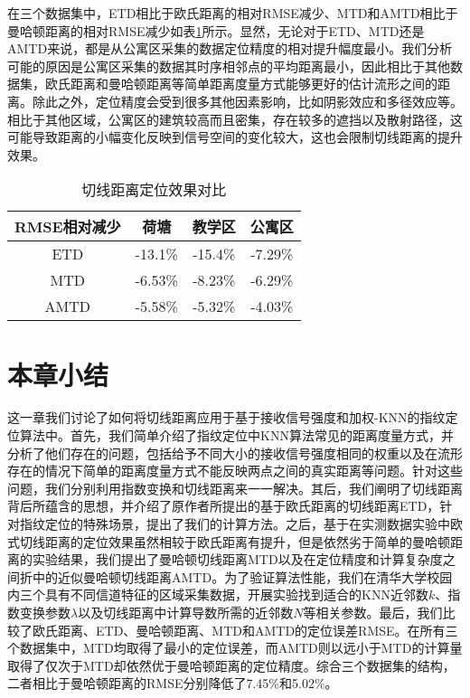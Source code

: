 在三个数据集中，ETD相比于欧氏距离的相对RMSE减少、MTD和AMTD相比于曼哈顿距离的相对RMSE减少如表\ref{tab:td_relative}所示。显然，无论对于ETD、MTD还是AMTD来说，都是从公寓区采集的数据定位精度的相对提升幅度最小。我们分析可能的原因是公寓区采集的数据其时序相邻点的平均距离最小，因此相比于其他数据集，欧氏距离和曼哈顿距离等简单距离度量方式能够更好的估计流形之间的距离。除此之外，定位精度会受到很多其他因素影响，比如阴影效应和多径效应等。相比于其他区域，公寓区的建筑较高而且密集，存在较多的遮挡以及散射路径，这可能导致距离的小幅变化反映到信号空间的变化较大，这也会限制切线距离的提升效果。

\begin{table}[htb]
	\caption{切线距离定位效果对比}
	\begin{center}
		\begin{tabular}{cccc}
			\toprule
			RMSE相对减少 &  荷塘 & 教学区 & 公寓区 \\
			\midrule
			ETD & -13.1\% & -15.4\% & -7.29\% \\
			\midrule
			MTD & -6.53\% & -8.23\% & -6.29\% \\
			\midrule
			AMTD & -5.58\% & -5.32\% & -4.03\% \\
			\bottomrule
		\end{tabular}
		\label{tab:td_relative}
	\end{center}
\end{table}

\section{本章小结}

这一章我们讨论了如何将切线距离应用于基于接收信号强度和加权-KNN的指纹定位算法中。首先，我们简单介绍了指纹定位中KNN算法常见的距离度量方式，并分析了他们存在的问题，包括给予不同大小的接收信号强度相同的权重以及在流形存在的情况下简单的距离度量方式不能反映两点之间的真实距离等问题。针对这些问题，我们分别利用指数变换和切线距离来一一解决。其后，我们阐明了切线距离背后所蕴含的思想，并介绍了原作者所提出的基于欧氏距离的切线距离ETD，针对指纹定位的特殊场景，提出了我们的计算方法。之后，基于在实测数据实验中欧式切线距离的定位效果虽然相较于欧氏距离有提升，但是依然劣于简单的曼哈顿距离的实验结果，我们提出了曼哈顿切线距离MTD以及在定位精度和计算复杂度之间折中的近似曼哈顿切线距离AMTD。为了验证算法性能，我们在清华大学校园内三个具有不同信道特征的区域采集数据，开展实验找到适合的KNN近邻数$k$、指数变换参数$\lambda$以及切线距离中计算导数所需的近邻数$N$等相关参数。最后，我们比较了欧氏距离、ETD、曼哈顿距离、MTD和AMTD的定位误差RMSE。在所有三个数据集中，MTD均取得了最小的定位误差，而AMTD则以远小于MTD的计算量取得了仅次于MTD却依然优于曼哈顿距离的定位精度。综合三个数据集的结构，二者相比于曼哈顿距离的RMSE分别降低了7.45\%和5.02\%。





